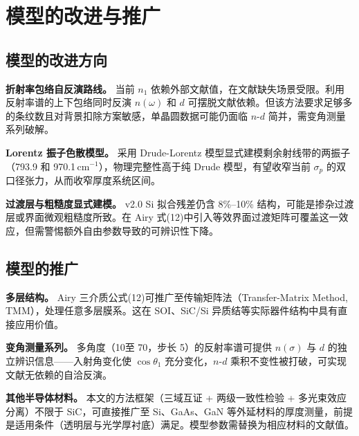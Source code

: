 \section{模型的改进与推广}

\subsection{模型的改进方向}

\textbf{折射率包络自反演路线。} 当前 $n_1$ 依赖外部文献值，在文献缺失场景受限。利用反射率谱的上下包络同时反演 $n(\omega)$ 和 $d$ 可摆脱文献依赖。但该方法要求足够多的条纹数且对背景扣除方案敏感，单晶圆数据可能仍面临 $n$-$d$ 简并，需变角测量系列破解。

\textbf{Lorentz 振子色散模型。} 采用 Drude-Lorentz 模型显式建模剩余射线带的两振子（793.9 和 970.1\,cm$^{-1}$），物理完整性高于纯 Drude 模型，有望收窄当前 $\sigma_p$ 的双口径张力，从而收窄厚度系统区间。

\textbf{过渡层与粗糙度显式建模。} v2.0 Si 拟合残差仍含 8\%--10\% 结构，可能是掺杂过渡层或界面微观粗糙度所致。在 Airy 式(12)中引入等效界面过渡矩阵可覆盖这一效应，但需警惕额外自由参数导致的可辨识性下降。

\subsection{模型的推广}

\textbf{多层结构。} Airy 三介质公式(12)可推广至传输矩阵法（Transfer-Matrix Method, TMM），处理任意多层膜系。这在 SOI、SiC/Si 异质结等实际器件结构中具有直接应用价值。

\textbf{变角测量系列。} 多角度（10\degree 至 70\degree，步长 5\degree）的反射率谱可提供 $n(\sigma)$ 与 $d$ 的独立辨识信息——入射角变化使 $\cos\theta_1$ 充分变化，$n$-$d$ 乘积不变性被打破，可实现文献无依赖的自洽反演。

\textbf{其他半导体材料。} 本文的方法框架（三域互证 + 两级一致性检验 + 多光束效应分离）不限于 SiC，可直接推广至 Si、GaAs、GaN 等外延材料的厚度测量，前提是适用条件（透明层与光学厚衬底）满足。模型参数需替换为相应材料的文献值。